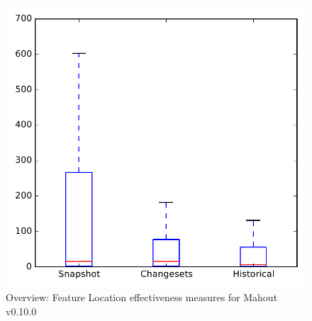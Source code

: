 
\begin{figure}
\centering
\includegraphics[height=0.4\textheight]{figures/flt/all_mahout_no_outlier}
\caption{Overview: Feature Location effectiveness measures for Mahout v0.10.0}
\label{fig:flt:all:mahout}
\end{figure}
